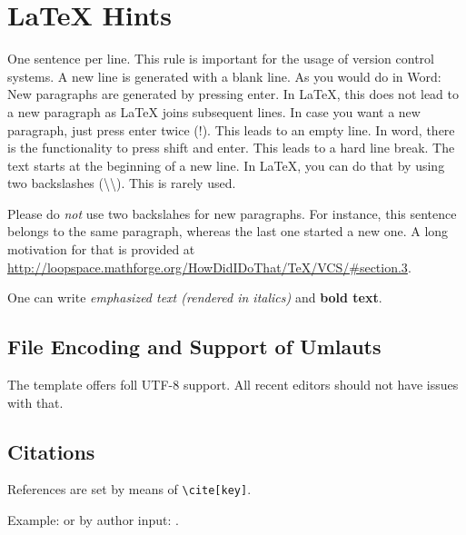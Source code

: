 
\chapter{LaTeX Hints}
\label{chap:latexhints}

One sentence per line.
This rule is important for the usage of version control systems.
A new line is generated with a blank line.
As you would do in Word:
New paragraphs are generated by pressing enter.
In LaTeX, this does not lead to a new paragraph as LaTeX joins subsequent lines.
In case you want a new paragraph, just press enter twice (!).
This leads to an empty line.
In word, there is the functionality to press shift and enter.
This leads to a hard line break.
The text starts at the beginning of a new line.
In LaTeX, you can do that by using two backslashes (\textbackslash\textbackslash).
This is rarely used.

Please do \textit{not} use two backslahes for new paragraphs.
For instance, this sentence belongs to the same paragraph, whereas the last one started a new one.
A long motivation for that is provided at \url{http://loopspace.mathforge.org/HowDidIDoThat/TeX/VCS/#section.3}.

One can write \emph{emphasized text (rendered in italics)} and \textbf{bold text}.

\section{File Encoding and Support of Umlauts}
\label{sec:firstsectioninlatexhints}
The template offers foll UTF-8 support.
All recent editors should not have issues with that.

\section{Citations}


References are set by means of \texttt{\textbackslash cite[key]}.

\begin{filecontents*}{\democodefile}
Example: \cite{WSPA} or by author input: \citet{WSPA}.
\end{filecontents*}

